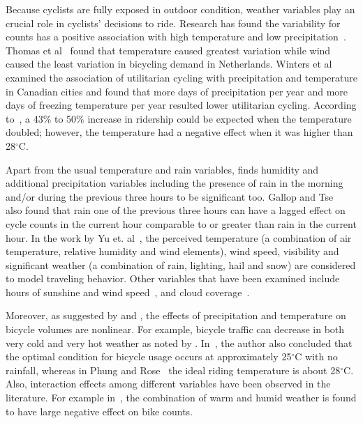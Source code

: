 \documentclass [11pt, proquest] {uwthesis}[2015/03/03]
\begin{document}
Because cyclists are fully exposed in outdoor condition, weather variables play an crucial role in cyclists' decisions to ride. Research has found the variability for counts has a positive association with high temperature and low precipitation~\cite{Niemeier:1996aa,Parkin:2008aa}. Thomas et al~\cite{Thomas:2009aa} found that temperature caused greatest variation while wind caused the least variation in bicycling demand in Netherlands. Winters et al~\cite{Winters07} examined the association of utilitarian cycling with precipitation and temperature in Canadian cities and found that more days of precipitation per year and more days of freezing temperature per year resulted lower utilitarian cycling. According to~\cite{Miranda-Moreno:2011aa}, a 43\% to 50\% increase in ridership could be expected when the temperature doubled; however, the temperature had a negative effect when it was higher than 28$^\circ$C.

Apart from the usual temperature and rain variables, \cite{Miranda-Moreno:2011aa} finds humidity and additional precipitation variables including the presence of rain in the morning and/or during the previous three hours to be significant too. Gallop and Tse~\cite{Gallop:2012aa} also found that rain one of the previous three hours can have a lagged effect on cycle counts in the current hour comparable to or greater than rain in the current hour. In the work by Yu et. al~\cite{Yu09}, the perceived temperature (a combination of air temperature, relative humidity and wind elements), wind speed, visibility and significant weather (a combination of rain, lighting, hail and snow) are considered to model traveling behavior. Other variables that have been examined include hours of sunshine and wind speed~\cite{Thomas12}, and cloud coverage~\cite{Hanson77}.

Moreover, as suggested by \cite{Lewin:2011aa} and \cite{Thomas:2009aa}, the effects of precipitation and temperature on bicycle volumes are nonlinear. For example, bicycle traffic can decrease in both very cold and very hot weather as noted by \cite{Richardson:2000aa}. In~\cite{Richardson:2000aa}, the author also concluded that the optimal condition for bicycle usage occurs at approximately 25$^\circ$C with no rainfall, whereas in Phung and Rose~\cite{Rose07} the ideal riding temperature is about 28$^\circ$C. Also, interaction effects among different variables have been observed in the literature. For example in~\cite{Miranda-Moreno:2011aa}, the combination of warm and humid weather is found to have large negative effect on bike counts.
\end{document}
